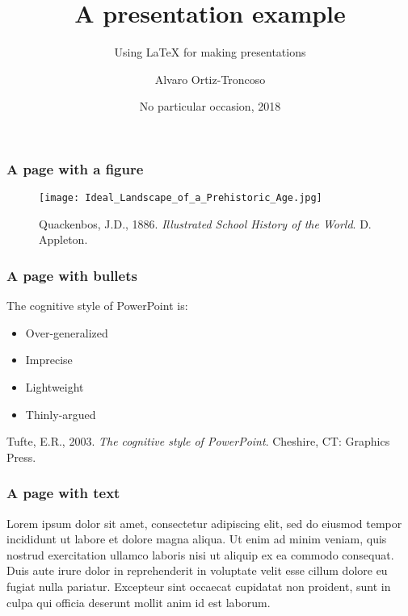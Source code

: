 % 


\title{A presentation example}
\subtitle{Using LaTeX for making presentations}
\author{Alvaro Ortiz-Troncoso}
\date{No particular occasion, 2018}
\subject{Templates and layout}



{
  {
  \frame{\titlepage}
  }
}
\addtocounter{framenumber}{-1}

\begin{frame}
  \frametitle{A page with a figure}
  \begin{figure}
    \texttt{[image: Ideal\_Landscape\_of\_a\_Prehistoric\_Age.jpg]}
    \caption{Quackenbos, J.D., 1886. \textit{Illustrated School History of the World}. D. Appleton.}
  \end{figure}
\end{frame}

\begin{frame}
  \frametitle{A page with bullets}
  The cognitive style of PowerPoint is:
  \begin{itemize}
  \item{Over-generalized}
  \item{Imprecise}
  \item{Lightweight}
  \item{Thinly-argued}
  \end{itemize}
  \bigskip
  \begin{center}\scriptsize{Tufte, E.R., 2003. \textit{The cognitive style of PowerPoint}. Cheshire, CT: Graphics Press.}\end{center}  
\end{frame}


\begin{frame}
  \frametitle{A page with text}
Lorem ipsum dolor sit amet, consectetur adipiscing elit, sed do eiusmod tempor incididunt ut labore et dolore magna aliqua. Ut enim ad minim veniam, quis nostrud exercitation ullamco laboris nisi ut aliquip ex ea commodo consequat. Duis aute irure dolor in reprehenderit in voluptate velit esse cillum dolore eu fugiat nulla pariatur. Excepteur sint occaecat cupidatat non proident, sunt in culpa qui officia deserunt mollit anim id est laborum.
\end{frame}

